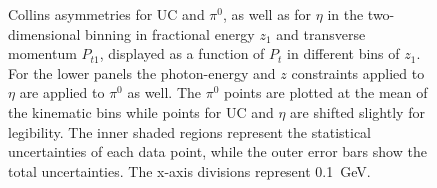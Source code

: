 \begin{figure}[H]
  \centering     
\caption[Collins asymmetries for UC and $\pi^0$, as well as for $\eta$ in the two-dimensional binning in  $z_{1}$ and $P_{t1}$]{Collins asymmetries for UC and $\pi^0$, as well as for $\eta$ in the two-dimensional binning in fractional energy $z_{1}$ and transverse momentum $P_{t1}$, displayed as a function of $P_t$ in different bins of $z_{1}$.
For the lower panels the photon-energy and $z$ constraints applied to $\eta$ are applied to $\pi^0$ as well. 
The $\pi^0$ points are plotted at the mean of the kinematic bins while points for UC and $\eta$ are shifted slightly for legibility. 
The inner shaded regions represent the statistical uncertainties of each data point, while the outer error bars show the total uncertainties.  The x-axis divisions represent 0.1~GeV.}
\label{fig:finalasymmetry5}
\end{figure}


